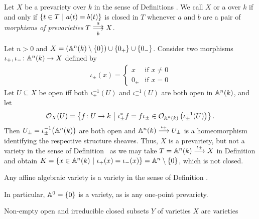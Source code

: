 \documentclass[a4paper,parskip=half,numbers=enddot, DIV=12]{scrreprt}
\begin{document}
\begin{defi}[Variety]
    Let $X$ be a prevariety over $k$ in the sense of Definitions . We call $X$  or a  over $k$ if and only if $\left\{t\in T\ \middle|\  a(t)=b(t)\right\}$ is closed in $T$ whenever $a$ and $b$ are a pair of \emph{morphisms of prevarieties} $T\doublemorphism[a][b] X$. 
\end{defi}

\begin{example}
    Let $n>0$ and $X = \left( \mathbb{A}^n(k) \setminus\{0\}\right) \cup \{0_+\} \cup \{0_-\}$. Consider two morphisms $\iota_+,\iota_-\colon \mathbb{A}^n(k) \to X$ defined by
    \begin{align*}
	\iota_\pm(x) = \begin{cases} x &\text{if }x\neq 0\\
			0_\pm &\text{if } x = 0
		    \end{cases}
    \end{align*}
    Let $U\subseteq X$ be open iff both $\iota_+^{-1} (U)$ and $\iota_-^{-1}(U)$ are both open in $\mathbb{A}^n(k)$, and let 
    \begin{align*}
        \mathcal{O}_X(U) = \left\{f\colon U\to k\ \middle|\  \iota_\pm^* f = f \iota_\pm \in \mathcal{O}_{\mathbb{A}^n(k)} \left(\iota_\pm^{-1}(U)\right)\right\}.
    \end{align*}
    Then $U_\pm = \iota_\pm^{-1}\big(\mathbb{A}^n(k)\big)$ are both open and $\IA^n(k)\morphism[\iota_\pm] U_\pm$ is a homeomorphism identifying the respective structure sheaves. Thus, $X$ is a prevariety, but not a variety in the sense of Definition~ as we may take $T=\IA^n(k) \morphism[\iota_\pm] X$ in Definition  and obtain $K = \left\{x\in \mathbb{A}^n(k)\ \middle|\  \iota_+(x) = \iota_-(x)\right\} = \mathbb{A}^n\setminus\{0\}$, which is not closed.
\end{example}
\begin{example}
    \begin{alphanumerate}
    \item {}
        Any affine algebraic variety is a variety in the sense of Definition .
    \item
        In particular, $\mathbb{A}^0 = \{0\}$ is a variety, as is any one-point prevariety.
    \item 
        Non-empty open and irreducible closed subsets $Y$ of varieties $X$ are varieties 
    \end{alphanumerate}
\end{example}
\end{document}
